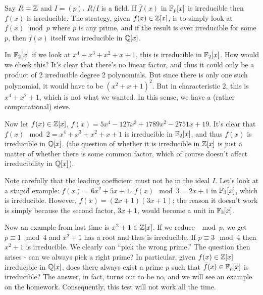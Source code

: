 \documentclass{../mathnotes}
\begin{document}
\begin{exmp}
    Say $R=\mathbb{Z}$ and $I=(p)$. $R/I$ is a field. If $\bar f(x)$ in $\mathbb{F}_p[x]$ is irreducible then $f(x)$ is irreducible.
    The strategy, given $f(x)\in\mathbb{Z}[x]$, is to simply look at $f(x)\mod p$ where $p$ is any prime, and if the result
    is ever irreducible for some $p$, then $f(x)$ itself was irreducible in $\mathbb{Q}[x]$.

    In $\mathbb{F}_2[x]$ if we look at $x^4+x^3+x^2+x+1$, this is irreducible in $\mathbb{F}_2[x]$. How would we check this? It's clear that
    there's no linear factor, and thus it could only be a product of 2 irreducible degree 2 polynomials. But since there is only
    one such polynomial, it would have to be $(x^2+x+1)^2$. But in characteristic 2, this is $x^4+x^2+1$, which is not what
    we wanted. In this sense, we have a (rather computational) sieve.

    Now let $f(x)\in \mathbb{Z}[x]$, $f(x)=5x^4-127x^3+1789x^2-2751x+19$. It's clear that $f(x)\mod 2=x^4+x^3+x^2+x+1$ is
    irreducible in $\mathbb{F}_2[x]$, and thus $f(x)$ is irreducible in $\mathbb{Q}[x]$. (the question of whether it is irreducible
    in $\mathbb{Z}[x]$ is just a matter of whether there is some common factor, which of course doesn't affect irreducibility
    in $\mathbb{Q}[x]$).

    Note carefully that the leading coefficient must not be in the ideal $I$. Let's look at a stupid example:
    $f(x)=6x^2+5x+1$. $f(x)\mod 3=2x+1$ in $\mathbb{F}_3[x]$, which is irreducible. However, $f(x)=(2x+1)(3x+1)$; the reason it doesn't
    work is simply because the second factor, $3x+1$, would become a unit in $\mathbb{F}_3[x]$.
\end{exmp}

Now an example from last time is $x^2+1\in\mathbb{Z}[x]$. If we reduce $\mod p$, we get $p\equiv1\mod4$ and $x^2+1$ has a root
and thus is irreducible. If $p\equiv 3\mod 4$ then $x^2+1$ is irreducible. We clearly can ``pick the wrong prime.'' The
question then arises - can we always pick a right prime? In particular, given $f(x)\in\mathbb{Z}[x]$ irreducible in $\mathbb{Q}[x]$,
does there always exist a prime $p$ such that $\bar f(x)\in\mathbb{F}_p[x]$ is irreducible? The answer, in fact, turns out to be no,
and we will see an example on the homework. Consequently, this test will not work all the time.
\end{document}
